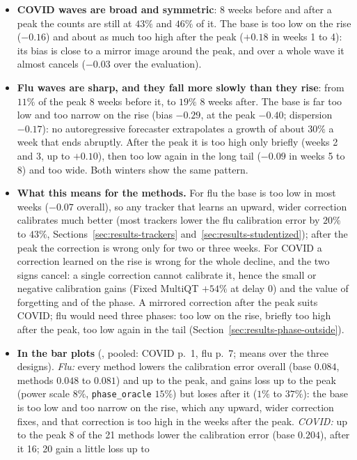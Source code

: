 \documentclass[11pt,a4paper]{article}
\theoremstyle{definition}
\theoremstyle{remark}
\begin{document}
\begin{itemize}[leftmargin=*,itemsep=3pt]
\item \textbf{COVID waves are broad and symmetric}: 8 weeks before and
after a peak the counts are still at $43\%$ and $46\%$ of it. The base is
too low on the rise ($-0.16$) and about as much too high after the peak
($+0.18$ in weeks 1 to 4): its bias is close to a mirror image around the
peak, and over a whole wave it almost cancels ($-0.03$ over the
evaluation).
\item \textbf{Flu waves are sharp, and they fall more slowly than they
rise}: from $11\%$ of the peak 8 weeks before it, to $19\%$ 8 weeks after.
The base is far too low and too narrow on the rise (bias $-0.29$, at the
peak $-0.40$; dispersion $-0.17$): no autoregressive forecaster
extrapolates a growth of about $30\%$ a week that ends abruptly. After the
peak it is too high only briefly (weeks 2 and 3, up to $+0.10$), then too
low again in the long tail ($-0.09$ in weeks 5 to 8) and too wide. Both
winters show the same pattern.
\item \textbf{What this means for the methods.} For flu the base is too low
in most weeks ($-0.07$ overall), so any tracker that learns an upward,
wider correction calibrates much better (most trackers lower the flu
calibration error by $20\%$ to $43\%$, Sections~\ref{sec:results-trackers}
and~\ref{sec:results-studentized}); after the peak the correction is wrong only
for two or three weeks. For COVID a correction learned on the rise is
wrong for the whole decline, and the two signs cancel: a single
correction cannot calibrate it, hence the small or negative calibration
gains (Fixed MultiQT $+54\%$ at delay 0) and the value of forgetting and
of the phase. A mirrored correction after the peak suits COVID; flu would
need three phases: too low on the rise, briefly too high after the peak,
too low again in the tail (Section~\ref{sec:results-phase-outside}).
\item \textbf{In the bar plots} (, pooled:
COVID p.~1, flu p.~7; means over the three designs). \emph{Flu:} every
method lowers the calibration error overall (base $0.084$, methods $0.048$
to $0.081$) and up to the peak, and gains loss up to the peak (power scale
$8\%$, \texttt{phase\_oracle} $15\%$) but loses after it ($1\%$ to $37\%$):
the base is too low and too narrow on the rise, which any upward, wider
correction fixes, and that correction is too high in the weeks after the
peak. \emph{COVID:} up to the peak 8 of the 21 methods lower the
calibration error (base $0.204$), after it 16; 20 gain a little loss up to

\end{itemize}
\end{document}
